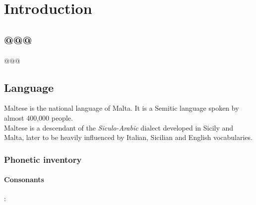 \documentclass[11pt,draft]{article}
\begin{document}
\maketitle


\section{Introduction}

\subsection{@@@}
@@@

\subsection{Language}
Maltese is the national language of Malta. It is a Semitic language spoken by almost 400,000 people\cite{borg1997maltese}.\\
Maltese is a descendant of the \emph{Siculo-Arabic} dialect developed in Sicily and Malta, later to be heavily influenced by Italian, Sicilian and English vocabularies.

\subsubsection{Phonetic inventory}

\paragraph{Consonants}
:

\end{document}
